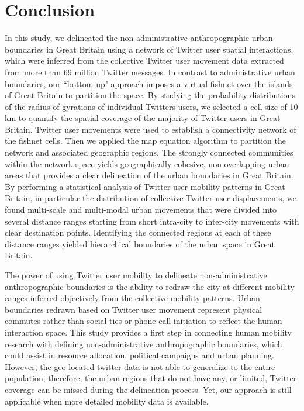 \documentclass[10pt,letterpaper]{article}
\begin{document}
\section*{Conclusion}
In this study, we delineated the non-administrative anthropographic urban boundaries in Great Britain using a network of Twitter user spatial interactions, which were inferred from the collective Twitter user movement data extracted from more than 69 million Twitter messages.
In contrast to administrative urban boundaries, our ``bottom-up" approach imposes a virtual fishnet over the islands of Great Britain to partition the space.
By studying the probability distributions of the radius of gyrations of individual Twitters users, we selected a cell size of 10 km to quantify the spatial coverage of the majority of Twitter users in Great Britain. 
Twitter user movements were used to establish a connectivity network of the fishnet cells.
Then we applied the map equation algorithm to partition the network and associated geographic regions.
The strongly connected communities within the network space yields geographically cohesive, non-overlapping urban areas that provides a clear delineation of the urban boundaries in Great Britain.
By performing a statistical analysis of Twitter user mobility patterns in Great Britain, in particular the distribution of collective Twitter user displacements, we found multi-scale and multi-modal urban movements that were divided into several distance ranges starting from short intra-city to inter-city movements with clear destination points.
Identifying the connected regions at each of these distance ranges yielded hierarchical boundaries of  the urban space in Great Britain.

The power of using Twitter user mobility to delineate non-administrative anthropographic boundaries is the ability to redraw the city at different mobility ranges inferred objectively from the collective mobility patterns. 
Urban boundaries redrawn based on Twitter user movement represent physical commutes rather than social ties or phone call initiation to reflect the human interaction space.
This study provides a first step in connecting human mobility research with defining non-administrative anthropographic boundaries, which could assist in resource allocation, political campaigns and urban planning. However, the geo-located twitter data is not able to generalize to the entire population; therefore, the urban regions that do not have any, or limited, Twitter coverage can be missed during the delineation process. Yet, our approach is still applicable when more detailed mobility data is available. 
\end{document}
